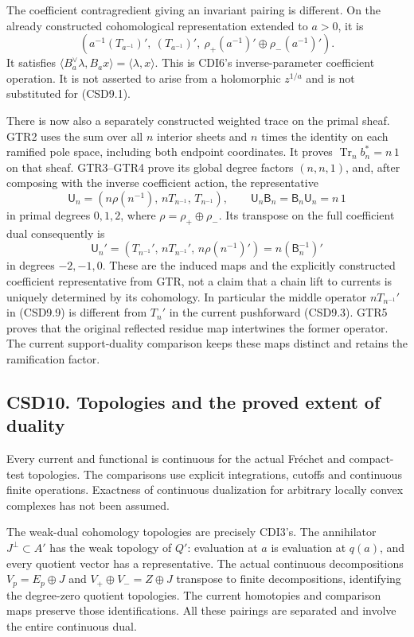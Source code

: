 The coefficient contragredient giving an invariant pairing is different.
On the already constructed cohomological representation extended to
\(a>0\), it is \[
(a^{-1}(T_{a^{-1}})',\ (T_{a^{-1}})',\
\rho_+(a^{-1})'\oplus\rho_-(a^{-1})').
\tag{CSD9.7}
\] It satisfies
\(\langle B_a^\vee\lambda,B_ax\rangle=\langle\lambda,x\rangle\). This is
CDI6's inverse-parameter coefficient operation. It is not asserted to
arise from a holomorphic \(z^{1/a}\) and is not substituted for
(CSD9.1).

There is now also a separately constructed weighted trace on the primal
sheaf. GTR2 uses the sum over all \(n\) interior sheets and \(n\) times
the identity on each ramified pole space, including both endpoint
coordinates. It proves \(\operatorname{Tr}_n b_n^*=n\,1\) on that sheaf.
GTR3--GTR4 prove its global degree factors \((n,n,1)\), and, after
composing with the inverse coefficient action, the representative \[
\mathsf U_n=(n\rho(n^{-1}),\,nT_{n^{-1}},\,T_{n^{-1}}),
\qquad
\mathsf U_n\mathsf B_n=\mathsf B_n\mathsf U_n=n\,1
\tag{CSD9.8}
\] in primal degrees \(0,1,2\), where \(\rho=\rho_+\oplus\rho_-\). Its
transpose on the full coefficient dual consequently is \[
\mathsf U_n'
=(T_{n^{-1}}',\,nT_{n^{-1}}',\,n\rho(n^{-1})')
=n(\mathsf B_n^{-1})'
\tag{CSD9.9}
\] in degrees \(-2,-1,0\). These are the induced maps and the explicitly
constructed coefficient representative from GTR, not a claim that a
chain lift to currents is uniquely determined by its cohomology. In
particular the middle operator \(nT_{n^{-1}}'\) in (CSD9.9) is different
from \(T_n'\) in the current pushforward (CSD9.3). GTR5 proves that the
original reflected residue map intertwines the former operator. The
current support-duality comparison keeps these maps distinct and retains
the ramification factor.

\subsection{CSD10. Topologies and the proved extent of
duality}\label{csd10.-topologies-and-the-proved-extent-of-duality}

Every current and functional is continuous for the actual Fréchet and
compact-test topologies. The comparisons use explicit integrations,
cutoffs and continuous finite operations. Exactness of continuous
dualization for arbitrary locally convex complexes has not been assumed.

The weak-dual cohomology topologies are precisely CDI3's. The
annihilator \(J^\perp\subset A'\) has the weak topology of \(Q'\):
evaluation at \(a\) is evaluation at \(q(a)\), and every quotient vector
has a representative. The actual continuous decompositions
\(V_p=E_p\oplus J\) and \(V_+\oplus V_-=Z\oplus J\) transpose to finite
decompositions, identifying the degree-zero quotient topologies. The
current homotopies and comparison maps preserve those identifications.
All these pairings are separated and involve the entire continuous dual.


